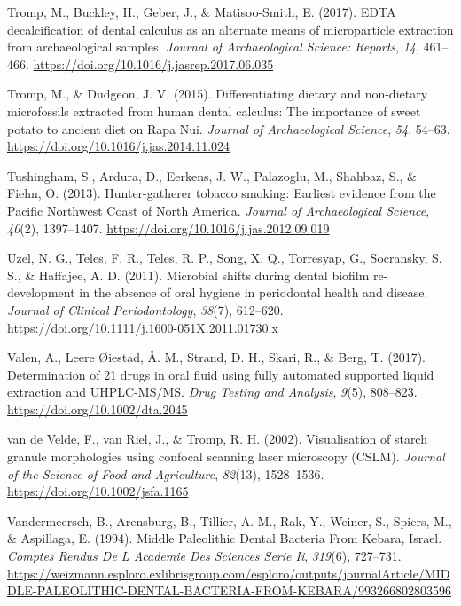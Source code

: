 \documentclass[
  letterpaper,
]{book}
\newlength{\cslhangindent}
\newlength{\cslentryspacingunit} %
\newenvironment{CSLReferences}[2] %
 {%
  \setlength{\parindent}{0pt}
  \ifodd #1
  \let\oldpar\par
  \def\par{\hangindent=\cslhangindent\oldpar}
  \fi
  \setlength{\parskip}{#2\cslentryspacingunit}
 }%
 {}
\begin{document}
\begin{CSLReferences}{1}{0}
\leavevmode{}%
Tromp, M., Buckley, H., Geber, J., \& Matisoo-Smith, E. (2017). {EDTA}
decalcification of dental calculus as an alternate means of
microparticle extraction from archaeological samples. \emph{Journal of
Archaeological Science: Reports}, \emph{14}, 461--466.
\url{https://doi.org/10.1016/j.jasrep.2017.06.035}

\leavevmode{}%
Tromp, M., \& Dudgeon, J. V. (2015). Differentiating dietary and
non-dietary microfossils extracted from human dental calculus: The
importance of sweet potato to ancient diet on {Rapa Nui}. \emph{Journal
of Archaeological Science}, \emph{54}, 54--63.
\url{https://doi.org/10.1016/j.jas.2014.11.024}

\leavevmode{}%
Tushingham, S., Ardura, D., Eerkens, J. W., Palazoglu, M., Shahbaz, S.,
\& Fiehn, O. (2013). Hunter-gatherer tobacco smoking: Earliest evidence
from the {Pacific Northwest Coast} of {North America}. \emph{Journal of
Archaeological Science}, \emph{40}(2), 1397--1407.
\url{https://doi.org/10.1016/j.jas.2012.09.019}

\leavevmode{}%
Uzel, N. G., Teles, F. R., Teles, R. P., Song, X. Q., Torresyap, G.,
Socransky, S. S., \& Haffajee, A. D. (2011). Microbial shifts during
dental biofilm re-development in the absence of oral hygiene in
periodontal health and disease. \emph{Journal of Clinical
Periodontology}, \emph{38}(7), 612--620.
\url{https://doi.org/10.1111/j.1600-051X.2011.01730.x}

\leavevmode{}%
Valen, A., Leere Øiestad, Å. M., Strand, D. H., Skari, R., \& Berg, T.
(2017). Determination of 21 drugs in oral fluid using fully automated
supported liquid extraction and {UHPLC-MS}/{MS}. \emph{Drug Testing and
Analysis}, \emph{9}(5), 808--823. \url{https://doi.org/10.1002/dta.2045}

\leavevmode{}%
van de Velde, F., van Riel, J., \& Tromp, R. H. (2002). Visualisation of
starch granule morphologies using confocal scanning laser microscopy
({CSLM}). \emph{Journal of the Science of Food and Agriculture},
\emph{82}(13), 1528--1536. \url{https://doi.org/10.1002/jsfa.1165}

\leavevmode{}%
Vandermeersch, B., Arensburg, B., Tillier, A. M., Rak, Y., Weiner, S.,
Spiers, M., \& Aspillaga, E. (1994). Middle {Paleolithic Dental Bacteria
From Kebara}, {Israel}. \emph{Comptes Rendus De L Academie Des Sciences
Serie Ii}, \emph{319}(6), 727--731.
\url{https://weizmann.esploro.exlibrisgroup.com/esploro/outputs/journalArticle/MIDDLE-PALEOLITHIC-DENTAL-BACTERIA-FROM-KEBARA/993266802803596}


\end{CSLReferences}
\end{document}
